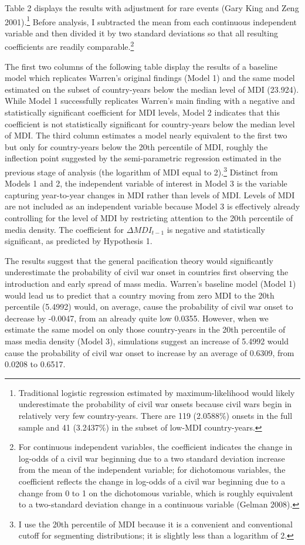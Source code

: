 \documentclass[11pt,article,oneside]{memoir}
\begin{document}
Table 2 displays the results with adjustment for rare events (Gary King
and Zeng 2001).\footnote{Traditional logistic regression estimated by
  maximum-likelihood would likely underestimate the probability of civil
  war onsets because civil wars begin in relatively very few
  country-years. There are 119 (2.0588\%) onsets in the full sample and
  41 (3.2437\%) in the subset of low-MDI country-years.} Before
analysis, I subtracted the mean from each continuous independent
variable and then divided it by two standard deviations so that all
resulting coefficients are readily comparable.\footnote{For continuous
  independent variables, the coefficient indicates the change in
  log-odds of a civil war beginning due to a two standard deviation
  increase from the mean of the independent variable; for dichotomous
  variables, the coefficient reflects the change in log-odds of a civil
  war beginning due to a change from 0 to 1 on the dichotomous variable,
  which is roughly equivalent to a two-standard deviation change in a
  continuous variable (Gelman 2008).}

The first two columns of the following table display the results of a
baseline model which replicates Warren's original findings (Model 1) and
the same model estimated on the subset of country-years below the median
level of MDI (23.924). While Model 1 successfully replicates Warren's
main finding with a negative and statistically significant coefficient
for MDI levels, Model 2 indicates that this coefficient is not
statistically significant for country-years below the median level of
MDI. The third column estimates a model nearly equivalent to the first
two but only for country-years below the 20th percentile of MDI, roughly
the inflection point suggested by the semi-parametric regression
estimated in the previous stage of analysis (the logarithm of MDI equal
to 2).\footnote{I use the 20th percentile of MDI because it is a
  convenient and conventional cutoff for segmenting distributions; it is
  slightly less than a logarithm of 2.} Distinct from Models 1 and 2,
the independent variable of interest in Model 3 is the variable
capturing year-to-year changes in MDI rather than levels of MDI. Levels
of MDI are not included as an independent variable because Model 3 is
effectively already controlling for the level of MDI by restricting
attention to the 20th percentile of media density. The coefficient for
$\Delta$$MDI_{t-1}$ is negative and statistically significant, as
predicted by Hypothesis 1.

The results suggest that the general pacification theory would
significantly underestimate the probability of civil war onset in
countries first observing the introduction and early spread of mass
media. Warren's baseline model (Model 1) would lead us to predict that a
country moving from zero MDI to the 20th percentile (5.4992) would, on
average, cause the probability of civil war onset to decrease by
-0.0047, from an already quite low 0.0355. However, when we estimate the
same model on only those country-years in the 20th percentile of mass
media density (Model 3), simulations suggest an increase of 5.4992 would
cause the probability of civil war onset to increase by an average of
0.6309, from 0.0208 to 0.6517.
\end{document}
